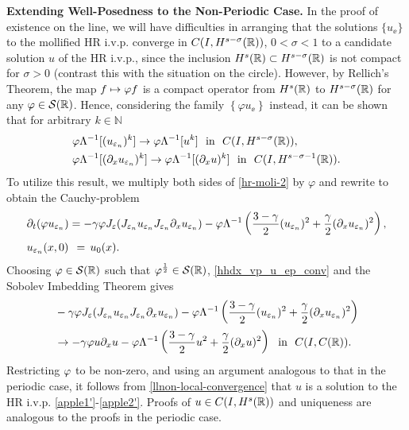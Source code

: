 \textbf{Extending Well-Posedness to the Non-Periodic Case.}
In the proof of existence on the line, we will have difficulties in 
arranging
that the solutions $\{u_\ee\}$ to the mollified HR i.v.p. converge in $C(I,
H^{s- \sigma}(\mathbb{R}))$, $0 < \sigma < 1$ to a candidate solution $u$ of the 
HR i.v.p., since the inclusion $H^s(\mathbb{R}) \subset H^{s-\sigma}(\mathbb{R})$ is not 
compact for $\sigma > 0$ (contrast this with the situation on the circle).  
However, by Rellich's Theorem, the map $f \mapsto \varphi f$
is a compact operator from $H^s(\mathbb{R})$ to  $H^{s-\sigma}(\mathbb{R})$ for any $\varphi 
\in \mathcal{S}(\mathbb{R})$.
Hence, considering the family $\left\{ \varphi
u_\ee \right\}$ instead, it can be shown that 
for arbitrary $k \in \mathbb{N}$
%
%
\begin{equation}
\begin{split}
& \vp \Lambda^{-1} [(u_{\ee_n})^k] \to \vp \Lambda^{-1} [u^k] \ \ \text{in}  \ \ C(I,
H^{s-\sigma }(\rr)),
\\
& \vp \Lambda^{-1} [(\p_x u_{\ee_n})^k] \to \vp \Lambda^{-1} [(\p_x u)^k] \ \
\text{in}  \ \ C(I,
H^{s-\sigma -1}(\rr)).
\label{hhdx_vp_u_ep_conv}
\end{split}
\end{equation}
%
%
%
%
To utilize this result, we multiply both sides of \eqref{hr-moli-2} by 
$\varphi$ and rewrite to obtain the Cauchy-problem
%
%
\begin{align}
\label{hh3}
 & \partial_t(\varphi u_{\varepsilon_n} )  = -\gamma \varphi J_\varepsilon (J_{\varepsilon_n} u_{\varepsilon_n} 
J_{\varepsilon_n} \partial_x u_{\varepsilon_n}) - \varphi \Lambda^{-1} \left( \frac{3-\gamma}{2} 
(u_{\varepsilon_n})^2
+ \frac{\gamma}{2} (\partial_x u_{\varepsilon_n})^2 \right ),
\\
& u_{\varepsilon_n}(x, 0) \phantom{\,,} = \phantom{\,} u_0 (x).
\label{real-line-moli-data-2} 
\end{align}
%
%
Choosing $\varphi \in \mathcal{S}(\mathbb{R})$ such that
$\varphi^\frac{1}{2} \in \mathcal{S}(\mathbb{R})$, \eqref{hhdx_vp_u_ep_conv} and the 
Sobolev Imbedding Theorem
gives 
%
%
%
\begin{equation}
\begin{split}
	& -\gamma \varphi J_\varepsilon (J_{\varepsilon_n} u_{\varepsilon_n} 
J_{\varepsilon_n} \partial_x u_{\varepsilon_n}) - \varphi \Lambda^{-1} \left( \frac{3-\gamma}{2}
(u_{\varepsilon_n})^2
+ \frac{\gamma}{2} (\partial_x u_{\varepsilon_n})^2 \right )
\\
& \to -\gamma \varphi u \partial_x u - \varphi \Lambda^{-1} \left( \frac{3-\gamma}{2} u^2
+ \frac{\gamma}{2} (\partial_x u)^2 \right ) \ \
\text{in} \ \ C(I, C(\mathbb{R})).
\label{llnon-local-convergence}
\end{split}
\end{equation}
%
%
%
Restricting $\varphi$ to be non-zero, and using an argument analogous to that in the periodic case, it follows from 
\eqref{llnon-local-convergence} that $u$ is a solution to the HR i.v.p.
\eqref{apple1'}-\eqref{apple2'}. Proofs of 
$u \in C(I, H^s(\mathbb{R}))$ and uniqueness are analogous to the proofs in 
the periodic case.
%
%

